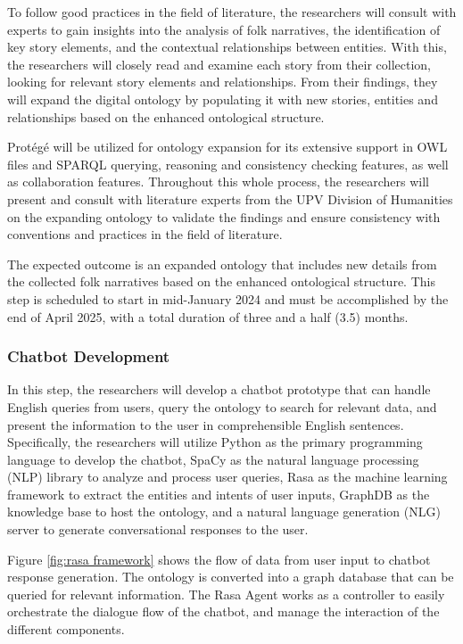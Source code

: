     To follow good practices in the field of literature, the researchers will consult with experts to gain insights into the analysis of folk narratives, the identification of key story elements, and the contextual relationships between entities. With this, the researchers will closely read and examine each story from their collection, looking for relevant story elements and relationships. From their findings, they will expand the digital ontology by populating it with new stories, entities and relationships based on the enhanced ontological structure. 
    
    Protégé will be utilized for ontology expansion for its extensive support in OWL files and SPARQL querying, reasoning and consistency checking features, as well as collaboration features. Throughout this whole process, the researchers will present and consult with literature experts from the UPV Division of Humanities on the expanding ontology to validate the findings and ensure consistency with conventions and practices in the field of literature.
    
    The expected outcome is an expanded ontology that includes new details from the collected folk narratives based on the enhanced ontological structure. This step is scheduled to start in mid-January 2024 and must be accomplished by the end of April 2025, with a total duration of three and a half (3.5) months.

\subsubsection{Chatbot Development}
    In this step, the researchers will develop a chatbot prototype that can handle English queries from users, query the ontology to search for relevant data, and present the information to the user in comprehensible English sentences. Specifically, the researchers will utilize Python as the primary programming language to develop the chatbot, SpaCy as the natural language processing (NLP) library to analyze and process user queries, Rasa as the machine learning framework to extract the entities and intents of user inputs, GraphDB as the knowledge base to host the ontology, and a natural language generation (NLG) server to generate conversational responses to the user.
    
    Figure \ref{fig:rasa framework} shows the flow of data from user input to chatbot response generation. The ontology is converted into a graph database that can be queried for relevant information. The Rasa Agent works as a controller to easily orchestrate the dialogue flow of the chatbot, and manage the interaction of the different components. 
    
